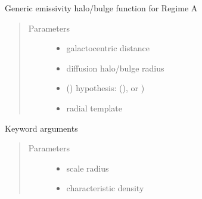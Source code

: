 \documentclass[letterpaper,10pt,english]{sphinxmanual}
\begin{document}
\begin{fulllineitems}
\label{\detokenize{diffsph.profiles:diffsph.profiles.hfactors.Hem_A}}
\sphinxAtStartPar
Generic emissivity halo/bulge function for Regime A
\begin{quote}\begin{description}
\item[{Parameters}] \leavevmode\begin{itemize}
\item {} 
\sphinxAtStartPar
{} \textendash{} galactocentric distance

\item {} 
\sphinxAtStartPar
{} \textendash{} diffusion halo/bulge radius

\item {} 
\sphinxAtStartPar
{} () \textendash{} hypothesis:  (),  or )

\item {} 
\sphinxAtStartPar
{} \textendash{} radial template

\end{itemize}

\end{description}\end{quote}

\sphinxAtStartPar
Keyword arguments
\begin{quote}\begin{description}
\item[{Parameters}] \leavevmode\begin{itemize}
\item {} 
\sphinxAtStartPar
{} \textendash{} scale radius

\item {} 
\sphinxAtStartPar
{} \textendash{} characteristic density


\end{itemize}
\end{description}
\end{quote}
\end{fulllineitems}
\end{document}
